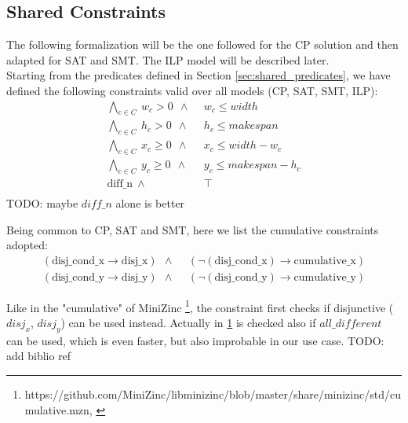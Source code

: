 

\subsection{Shared Constraints} \label{sec:shared_constraints}
    The following formalization will be the one followed for the CP solution and then adapted for
    SAT and SMT. The ILP model will be described later. \\

    Starting from the predicates defined in Section \ref{sec:shared_predicates}, we have defined 
    the following constraints valid over all models (CP, SAT, SMT, ILP):
    \begin{align*}
        \bigwedge_{c \in C}\ w_c > 0\ \    \land\                   &\ w_c \leq width \\
        \bigwedge_{c \in C}\ h_c > 0\ \   \land\                    &\ h_c \leq makespan \\
        \bigwedge_{c \in C}\ x_c \geq 0\ \ \land\                   &\ x_c \leq width - w_c \\
        \bigwedge_{c \in C}\ y_c \geq 0\ \ \land\                   &\ y_c \leq makespan - h_c \\
        \text{diff\_n}\ \ \land\ &\ \top \\
    \end{align*}
    \colorbox{BurntOrange}{TODO: maybe $diff\_n$ alone is better}

    Being common to CP, SAT and SMT, here we list the cumulative constraints adopted:
    \begin{align*}
        (\text{disj\_cond\_x} \rightarrow \text{disj\_x})\ \ \land\ &\ (\neg (\text{disj\_cond\_x}) \rightarrow \text{cumulative\_x}) \\
        (\text{disj\_cond\_y} \rightarrow \text{disj\_y})\ \ \land\ &\ (\neg (\text{disj\_cond\_y}) \rightarrow \text{cumulative\_y})
    \end{align*}

    Like in the "cumulative" of MiniZinc \footnote[1]{https://github.com/MiniZinc/libminizinc/blob/master/share/minizinc/std/cumulative.mzn, \label{fn:minizinc_cumulative}}, 
    the constraint first checks if disjunctive 
    ($disj_x$, $disj_y$) can be used instead. Actually in \ref{fn:minizinc_cumulative} 
    is checked also if $all\_different$ can be used, which is even faster, but also improbable in our use case. 
    \colorbox{BurntOrange}{TODO: add biblio ref}

